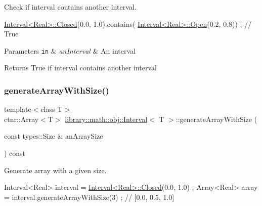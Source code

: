 Check if interval contains another interval. 


\begin{DoxyCode}
\hyperlink{classlibrary_1_1math_1_1obj_1_1_interval_aae8bb2b89af450729338d48563def4d7}{Interval<Real>::Closed}(0.0, 1.0).contains(
      \hyperlink{classlibrary_1_1math_1_1obj_1_1_interval_add0e1114a0c153da7a928fd059a08919}{Interval<Real>::Open}(0.2, 0.8)) ; \textcolor{comment}{// True}
\end{DoxyCode}



\begin{DoxyParams}[1]{Parameters}
\mbox{\tt in}  & {\em an\+Interval} & An interval \\
\hline
\end{DoxyParams}
\begin{DoxyReturn}{Returns}
True if interval contains another interval 
\end{DoxyReturn}
\mbox{\label{classlibrary_1_1math_1_1obj_1_1_interval_a250e05a1f463f107952b437e5ff4f4d2}} 
\subsubsection{\texorpdfstring{generate\+Array\+With\+Size()}{generateArrayWithSize()}}
{\footnotesize\ttfamily template$<$class T$>$ \\
ctnr\+::\+Array$<$T$>$ \hyperlink{classlibrary_1_1math_1_1obj_1_1_interval}{library\+::math\+::obj\+::\+Interval}$<$ T $>$\+::generate\+Array\+With\+Size (\begin{DoxyParamCaption}\item[{const types\+::\+Size \&}]{an\+Array\+Size }\end{DoxyParamCaption}) const}



Generate array with a given size. 


\begin{DoxyCode}
Interval<Real> interval = \hyperlink{classlibrary_1_1math_1_1obj_1_1_interval_aae8bb2b89af450729338d48563def4d7}{Interval<Real>::Closed}(0.0, 1.0) ;
Array<Real> array = interval.generateArrayWithSize(3) ; \textcolor{comment}{// [0.0, 0.5, 1.0]}
\end{DoxyCode}



